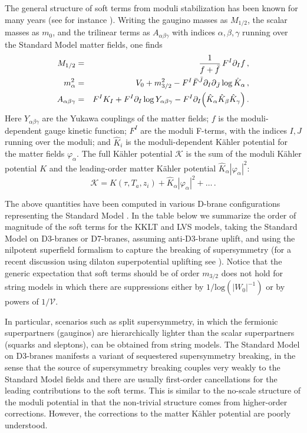 \documentclass[12pt,a4wide]{article}
\def\V{\mathcal{V}}
\def\be{\begin{equation}}
\def\ee{\end{equation}}
\begin{document}
The general structure of soft terms from moduli stabilization has been known for many years (see for instance  \cite{Kaplunovsky:1993rd,Brignole:1993dj}). Writing the gaugino masses as $M_{1/2}$, the scalar masses as $m_0$, and the trilinear terms as $A_{\alpha\beta\gamma}$ with indices $\alpha,\beta,\gamma$ running over the Standard Model matter fields, one finds
\begin{eqnarray}
M_{1/2}& = & \frac{1}{f+\bar{f}}\,F^I\partial_I f\,, \nonumber \\
m_\alpha^2& = & V_0 +m_{3/2}^2-F^I {\bar F}^{{\bar J}}\partial_I\partial_{{\bar J}}\log \hat K_\alpha\,,\\
A_{\alpha\beta\gamma} & = & F^IK_I+F^I\partial_I \log Y_{\alpha\beta\gamma}- F^I \partial_I \Bigl(\hat K_\alpha \hat K_\beta \hat K_\gamma\Bigr)\,.\nonumber
\end{eqnarray}
Here $Y_{\alpha\beta\gamma}$ are the Yukawa couplings of the matter fields; $f$ is the moduli-dependent gauge kinetic function; $F^I$ are the moduli F-terms, with the indices $I,J$ running  over the moduli; and $\hat K_i$ is the moduli-dependent K\"ahler potential for the matter fields $\varphi_\alpha$. The full K\"ahler potential $\mathcal K$  is the sum of the moduli K\"ahler potential $K$ and the leading-order 
matter K\"ahler potential $\hat K_\alpha |\varphi_\alpha|^2$:
\be
\mathcal{K}= K(\tau, T_a, z_i) +\hat K_\alpha |\varphi_\alpha|^2+\ldots \,.
\ee

The above quantities have been computed in various D-brane  configurations representing the Standard Model \cite{Choi:2005ge, Conlon:2005ki,Conlon:2006wz,Blumenhagen:2009gk,Aparicio:2014wxa,Aparicio:2015psl}. In the table below we summarize the order of magnitude of the soft terms for the KKLT and LVS models, taking the Standard Model on D3-branes or D7-branes, assuming anti-D3-brane uplift, and using the nilpotent superfield formalism to capture the breaking of supersymmetry \cite{Aparicio:2015psl} (for a recent discussion using dilaton superpotential uplifting see \cite{Cicoli:2023gbd}). Notice that the generic expectation that soft terms should be of order $m_{3/2}$ does not hold for string models in which there are suppressions either by $1/\text{log}(|W_0|^{-1})$ or by powers of $1/\V$.

In particular, scenarios such as split supersymmetry, in which the fermionic  superpartners (gauginos) are hierarchically lighter than the scalar superpartners (squarks and sleptons), can be obtained from string models. 
The Standard Model on D3-branes 
manifests 
a variant of 
sequestered supersymmetry breaking,  
in the sense that the source of supersymmetry breaking couples very weakly to the Standard Model fields and there are  usually first-order cancellations for the leading contributions to the soft terms. This is similar to the no-scale structure of the moduli  potential in that the non-trivial structure comes from higher-order corrections. However, the corrections to the matter K\"ahler potential are poorly understood.
\end{document}
